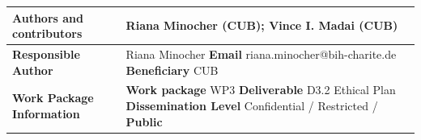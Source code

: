\vspace{1.4cm}

\begin{center}
\begin{tabular}{| p{2cm} | p{9.5cm} |} 
 \hline
 \textbf{Authors and contributors} & Riana Minocher (CUB); Vince I. Madai (CUB) \\ 
 \hline
 \textbf{Responsible Author} & Riana Minocher \textbf{Email} riana.minocher@bih-charite.de \textbf{Beneficiary} CUB \\
 \hline
 \textbf{Work Package Information} & \textbf{Work package} WP3 \textbf{Deliverable} D3.2 Ethical Plan  \textbf{Dissemination Level} Confidential / Restricted / \textbf{Public} \\ 
 \hline
\end{tabular}
\end{center}